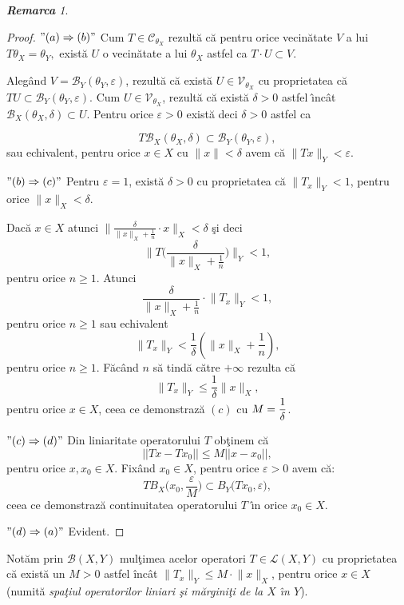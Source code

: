\documentclass[ a4paper, 12pt]{report}
\theoremstyle{definition}
\theoremstyle{remark}
\newtheorem{remarc}{\bf Remarca}[section]
\numberwithin{equation}{section}
\begin{document}
\begin{remarc}
\begin{proof}
$"(a) \Rightarrow  (b)"$ Cum $T \in \mathcal{C}_{\theta_{X}}$ rezult\u a c\u a pentru orice vecin\u atate $V$ a lui $T{\theta_{X}} = \theta_{Y},$ exist\u a $U$ o vecin\u atate a lui $\theta_{X}$ astfel ca $T \cdot U \subset V.$

Aleg\^and $ V = \mathcal{B}_{Y}(\theta_{Y}, \varepsilon)$, rezult\u a c\u a exist\u a  $U \in \mathcal{V}_{\theta_{X}}$ cu proprietatea c\u a $T U \subset \mathcal{B}_{Y}(\theta_{Y}, \varepsilon)$. Cum $U \in \mathcal{V}_{\theta_{X}}$, rezult\u a c\u a exist\u a  $\delta>0$ astfel \^\i nc\^ at $\mathcal{B}_{X}(\theta_{X}, \delta) \subset U$. Pentru orice $\varepsilon > 0$ exist\u a deci $\delta > 0$ astfel ca

$$T  \mathcal{B}_{X}(\theta_{X}, \delta) \subset \mathcal{B}_{Y}(\theta_{Y}, \varepsilon),$$ sau echivalent, pentru orice $x \in X$ cu $\lVert x \rVert < \delta$ avem c\u a $\lVert Tx \rVert_{Y}< \varepsilon.$

$"(b) \Rightarrow (c)"$
Pentru $\varepsilon =1$, exist\u a $\delta > 0$ cu proprietatea c\u a $\lVert T_x \rVert_{Y}<1$, pentru orice $\lVert x \rVert_{X} < \delta.$

Dac\u a $x \in X$ atunci $\lVert \frac{\delta}{\lVert x \rVert_{X}+\frac{1}{n}}\cdot x \rVert_{X} < \delta$ \c si deci
$$\lVert T \Big(  \frac{\delta}{\lVert x \rVert_{X}+\frac{1}{n}} \Big) \rVert_{Y} < 1,$$ pentru orice $n \geq 1$. Atunci
$$\frac{\delta}{\lVert x \rVert_{X}+\frac{1}{n}} \cdot \lVert T_x \rVert_{Y} < 1,$$ pentru orice $n \geq 1$ sau echivalent
$$\lVert T_x \rVert_{Y} < \frac{1}{\delta} \left( \lVert x \rVert_{X} + \frac{1}{n} \right),$$ pentru orice $n \geq 1$.  F\u ac\^ and $n$ s\u a tind\u a c\u atre $+ \infty$ rezulta c\u a
$$\lVert T_x \rVert_{Y} \leq \frac{1}{\delta}   \lVert x \rVert_{X},$$ pentru orice  $x \in X$, ceea ce demonstraz\u a $(c)$ cu $M = \displaystyle\frac{1}{\delta}$.

$"(c) \Rightarrow (d)"$ Din liniaritate operatorului $T$ ob\c tinem c\u a
$$||Tx - Tx_0|| \leq M ||x - x_0||,$$ pentru orice $x, x_0 \in X$. Fix\^ and $x_0 \in X$, pentru orice $\varepsilon > 0$ avem c\u a:
$$T B_X\big(x_0, \frac{\varepsilon}{M}\big) \subset B_Y\big( Tx_0, \varepsilon\big),$$ ceea ce demonstraz\u a  continuitatea operatorului $T$ \^\i n orice $x_0 \in X$.

$"(d)\Rightarrow  (a)"$ Evident.
\end{proof}

\end{remarc}
Not\u am prin $\mathcal{B}(X,Y)$ mul\c timea acelor operatori $T \in \mathcal{L}(X,Y)$ cu proprietatea c\u a  exist\u a  un $M>0$ astfel \^inc\^at $\lVert T_x \rVert_{Y} \leq M \cdot \lVert x \rVert_{X}$, pentru orice $x \in X$ (numit\u a {\it spa\c tiul operatorilor liniari \c si m\u argini\c ti de la $X$ \^\i n $Y$}).
\end{document}
